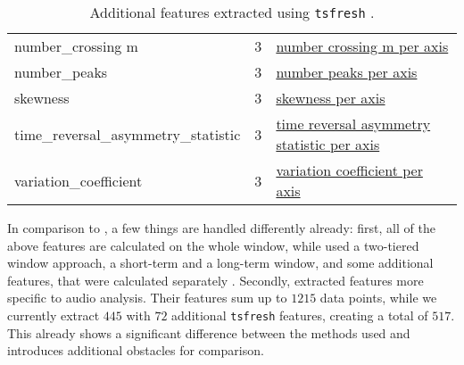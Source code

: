 \begin{table}[h]
{\begin{tabular}{|l|c|l|}
			number\_crossing m & 3 & \href{https://tsfresh.readthedocs.io/en/latest/api/tsfresh.feature_extraction.html\#tsfresh.feature_extraction.feature_calculators.number_crossing_m}{number crossing m per axis}\\
			number\_peaks & 3 & \href{https://tsfresh.readthedocs.io/en/latest/api/tsfresh.feature_extraction.html\#tsfresh.feature_extraction.feature_calculators.number_peaks}{number peaks per axis}\\
			skewness & 3 & \href{https://tsfresh.readthedocs.io/en/latest/api/tsfresh.feature_extraction.html\#tsfresh.feature_extraction.feature_calculators.skewness}{skewness per axis}\\
			time\_reversal\_asymmetry\_statistic & 3 & \href{https://tsfresh.readthedocs.io/en/latest/api/tsfresh.feature_extraction.html\#tsfresh.feature_extraction.feature_calculators.time_reversal_asymmetry_statistic}{time reversal asymmetry statistic per axis}\\
			variation\_coefficient & 3 & \href{https://tsfresh.readthedocs.io/en/latest/api/tsfresh.feature_extraction.html\#tsfresh.feature_extraction.feature_calculators.variation_coefficient}{variation coefficient per axis}\\
			\hline
		\end{tabular}
	}

	\caption{Additional features extracted using \texttt{tsfresh} \cite{DBLP:journals/ijon/ChristBNK18}.}
	\label{tab:features-additional}
\end{table}



In comparison to \cite{DBLP:conf/ijcai/KillianPNMC19}, a few things are handled differently already: first, all of the above features are calculated on the whole window, while \citeauthor{DBLP:conf/ijcai/KillianPNMC19} used a two-tiered window approach, a short-term and a long-term window, and some additional features, that were calculated separately \cite{DBLP:conf/ijcai/KillianPNMC19}.
Secondly, \citeauthor{DBLP:conf/ijcai/KillianPNMC19} extracted features more specific to audio analysis.
Their features sum up to $1215$ data points, while we currently extract $445$ with $72$ additional \texttt{tsfresh} features, creating a total of $517$. 
This already shows a significant difference between the methods used and introduces additional obstacles for comparison.














